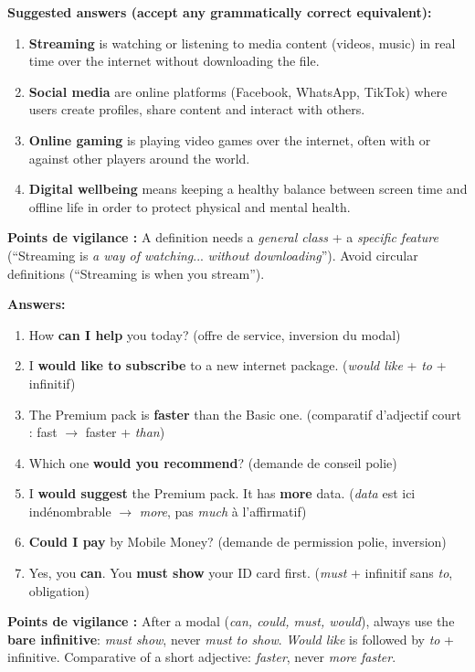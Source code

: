 \documentclass[11pt]{article}
\begin{document}
\begin{corrige}
\textbf{Suggested answers (accept any grammatically correct equivalent):}
\begin{enumerate}
\item \textbf{Streaming} is watching or listening to media content (videos, music) in real time over the internet without downloading the file.
\item \textbf{Social media} are online platforms (Facebook, WhatsApp, TikTok) where users create profiles, share content and interact with others.
\item \textbf{Online gaming} is playing video games over the internet, often with or against other players around the world.
\item \textbf{Digital wellbeing} means keeping a healthy balance between screen time and offline life in order to protect physical and mental health.
\end{enumerate}
\textbf{Points de vigilance :} A definition needs a \emph{general class} + a \emph{specific feature} (``Streaming is \emph{a way of watching}... \emph{without downloading}''). Avoid circular definitions (``Streaming is when you stream'').
\end{corrige}

\begin{corrige}
\textbf{Answers:}
\begin{enumerate}
\item How \textbf{can I help} you today? (offre de service, inversion du modal)
\item I \textbf{would like to subscribe} to a new internet package. (\emph{would like} + \emph{to} + infinitif)
\item The Premium pack is \textbf{faster} than the Basic one. (comparatif d'adjectif court : fast $\to$ faster + \emph{than})
\item Which one \textbf{would you recommend}? (demande de conseil polie)
\item I \textbf{would suggest} the Premium pack. It has \textbf{more} data. (\emph{data} est ici indénombrable $\to$ \emph{more}, pas \emph{much} à l'affirmatif)
\item \textbf{Could I pay} by Mobile Money? (demande de permission polie, inversion)
\item Yes, you \textbf{can}. You \textbf{must show} your ID card first. (\emph{must} + infinitif sans \emph{to}, obligation)
\end{enumerate}
\textbf{Points de vigilance :} After a modal (\emph{can, could, must, would}), always use the \textbf{bare infinitive}: \emph{must show}, never \emph{must to show}. \emph{Would like} is followed by \emph{to} + infinitive. Comparative of a short adjective: \emph{faster}, never \emph{more faster}.
\end{corrige}
\end{document}
